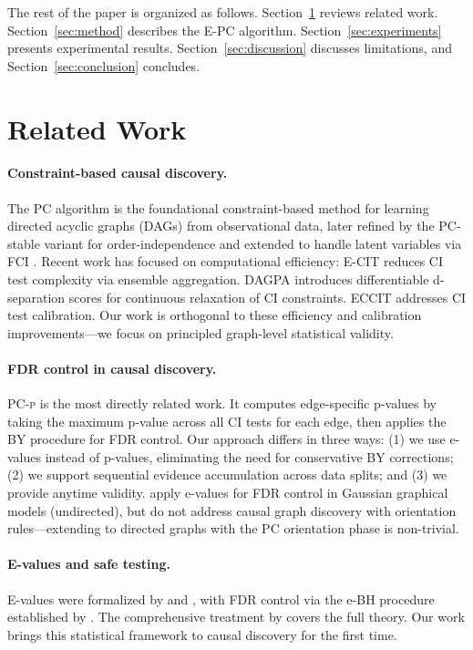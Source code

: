 \documentclass[11pt]{article}
\newcommand{\epc}{\textsc{E-PC}}
\newcommand{\pcp}{\textsc{PC-p}}
\begin{document}
The rest of the paper is organized as follows. Section~\ref{sec:related} reviews related work. Section~\ref{sec:method} describes the \epc{} algorithm. Section~\ref{sec:experiments} presents experimental results. Section~\ref{sec:discussion} discusses limitations, and Section~\ref{sec:conclusion} concludes.

\section{Related Work}
\label{sec:related}

\paragraph{Constraint-based causal discovery.}
The PC algorithm \citep{spirtes2000causation} is the foundational constraint-based method for learning directed acyclic graphs (DAGs) from observational data, later refined by the PC-stable variant \citep{colombo2014order} for order-independence and extended to handle latent variables via FCI \citep{spirtes2000causation}. Recent work has focused on computational efficiency: E-CIT \citep{guan2025efficient} reduces CI test complexity via ensemble aggregation. DAGPA \citep{zhou2025differentiable} introduces differentiable d-separation scores for continuous relaxation of CI constraints. ECCIT \citep{pan2026empirically} addresses CI test calibration. Our work is orthogonal to these efficiency and calibration improvements---we focus on principled graph-level statistical validity.

\paragraph{FDR control in causal discovery.}
\pcp{} \citep{strobl2019estimating} is the most directly related work. It computes edge-specific p-values by taking the maximum p-value across all CI tests for each edge, then applies the BY procedure \citep{benjamini2001control} for FDR control. Our approach differs in three ways: (1) we use e-values instead of p-values, eliminating the need for conservative BY corrections; (2) we support sequential evidence accumulation across data splits; and (3) we provide anytime validity. \citet{zhao2025fdr} apply e-values for FDR control in Gaussian graphical models (undirected), but do not address causal graph discovery with orientation rules---extending to directed graphs with the PC orientation phase is non-trivial.

\paragraph{E-values and safe testing.}
E-values were formalized by \citet{vovk2021evalues} and \citet{grunwald2024safe}, with FDR control via the e-BH procedure established by \citet{wang2022false}. The comprehensive treatment by \citet{ramdas2024hypothesis} covers the full theory. Our work brings this statistical framework to causal discovery for the first time.
\end{document}
